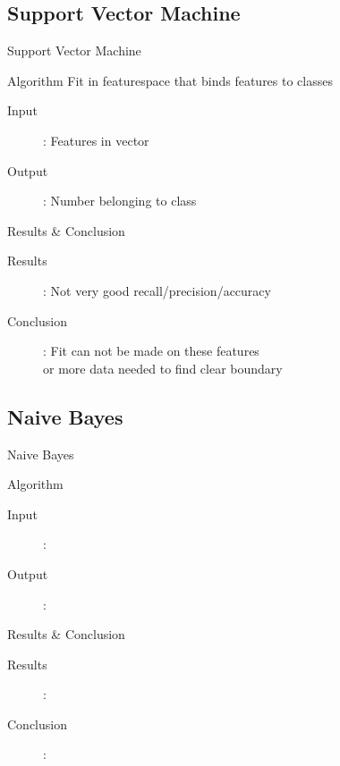 \documentclass{beamer}
\begin{document}
\subsection{Support Vector Machine}
\begin{frame}{Support Vector Machine}
\begin{block}{Algorithm}
Fit in featurespace that binds features to classes
\end{block}
\begin{description}
\item[Input]: Features in vector
\item[Output]: Number belonging to class
\end{description}
\end{frame}
\begin{frame}{Results \& Conclusion}
\begin{description}
\item[Results]: Not very good recall/precision/accuracy
\item[Conclusion]: Fit can not be made on these features\\ or more data needed to find clear boundary 
\end{description}
\end{frame}

\subsection{Naive Bayes}
\begin{frame}{Naive Bayes}
\begin{block}{Algorithm}
\end{block}
\begin{description}
\item[Input]: 
\item[Output]:
\end{description}
\end{frame}
\begin{frame}{Results \& Conclusion}
\begin{description}
\item[Results]:
\item[Conclusion]:
\end{description}
\end{frame}
\end{document}
